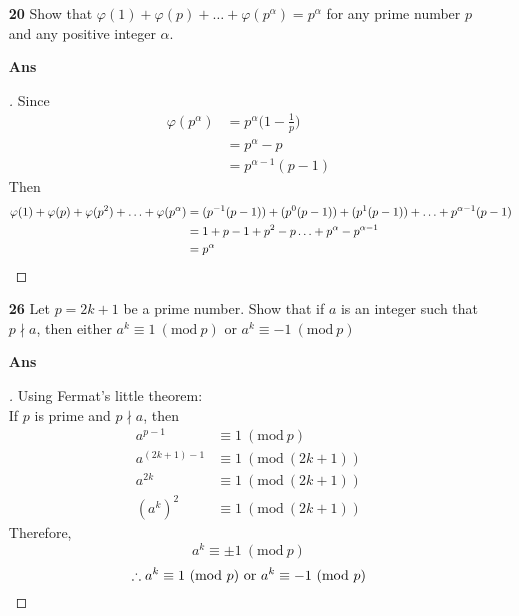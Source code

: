 \documentclass[paper=usletter, fontsize=12pt]{article}
\newcommand{\Mod}[1]{\ (\mathrm{mod}\ #1)}
\begin{document}
\begin{itemize}
\begin{itemize}
            \item[\textbf{20}] Show that
            $\varphi(1)+\varphi(p)+\ldots+\varphi(p^\alpha)=p^\alpha$ for
            any prime number $p$ and any positive integer $\alpha$.
            \item[\textbf{Ans}]
            \begin{proof}[\unskip\nopunct]
                Since
                \begin{align*}
                    \varphi(p^\alpha) & = p^\alpha \Bigg(1-\frac{1}{p}\Bigg)\\
                    & = p^\alpha - p\\
                    & = p^{\alpha-1}(p - 1)
                \end{align*}
                Then
                \begin{align*}
                    \varphi(1)+\varphi(p)+\varphi(p^2)+\ldots+\varphi(p^\alpha)
                    & = (p^{-1}(p - 1)) + (p^{0}(p - 1)) + (p^{1}(p - 1)) + \ldots + p^{\alpha-1}(p - 1) \\
                    & = 1 + p-1 + p^2 - p \ldots + p^\alpha - p^{\alpha-1}\\
                    & = p^\alpha \qedhere
                \end{align*}
            \end{proof}
            \vspace{0.2in}

            \item[\textbf{26}] Let $p=2k+1$ be a prime number. Show that if $a$
            is an integer such that $p \nmid a$, then either $a^k \equiv 1
            \Mod{p}$ or $a^k \equiv -1 \Mod{p}$
            \item[\textbf{Ans}]
            \begin{proof}[\unskip\nopunct]
                Using Fermat's little theorem:\\
                If $p$ is prime and $p \nmid a$, then
                \begin{align*}
                    a^{p-1} & \equiv 1 \Mod{p}\\
                    a^{(2k+1)-1} & \equiv 1 \Mod{(2k+1)}\\
                    a^{2k} & \equiv 1 \Mod{(2k+1)}\\
                    (a^{k})^2 & \equiv 1 \Mod{(2k+1)}
                \end{align*}
                Therefore,
                \begin{equation*}
                    a^{k} \equiv \pm 1 \Mod{p}
                \end{equation*}
                \begin{equation*}
                    \therefore a^k \equiv 1 \Mod{p} \text{ or } a^k \equiv -1 \Mod{p} \qedhere
                \end{equation*}
            \end{proof}
            \vspace{0.2in}

        \end{itemize}

    \end{itemize}
\end{document}
